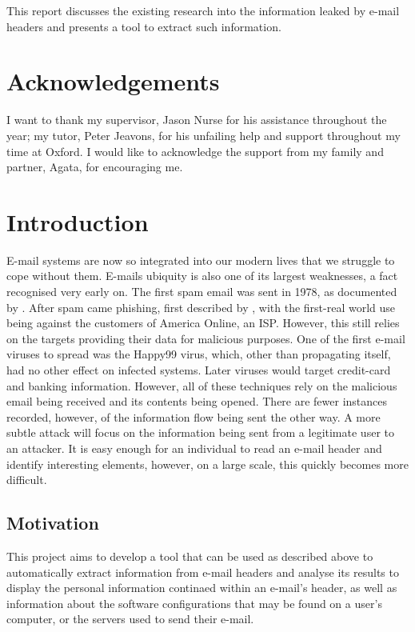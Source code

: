 \documentclass[twoside,10pt]{scrreprt}
\begin{document}
This report discusses the existing research into the information leaked by e-mail headers and presents a tool to extract such information.

\chapter*{Acknowledgements}
I want to thank my supervisor, Jason Nurse for his assistance throughout the year; my tutor, Peter Jeavons, for his unfailing help and support throughout my time at Oxford.  I would like to acknowledge the support from my family and partner, Agata, for encouraging me.

\tableofcontents
\listoftables
\listoffigures
\chapter{Introduction}
E-mail systems are now so integrated into our modern lives that we struggle to cope without them.  E-mails ubiquity is also one of its largest weaknesses, a fact recognised very early on.  The first spam email was sent in 1978, as documented by \cite{templeton}.  After spam came phishing, first described by \cite{felix1987system}, with the first-real world use being against the customers of America Online, an ISP.  However, this still relies on the targets providing their data for malicious purposes.  One of the first e-mail viruses to spread was the Happy99 virus, which, other than propagating itself, had no other effect on infected systems.  Later viruses would target credit-card and banking information.  However, all of these techniques rely on the malicious email being received and its contents being opened.  There are fewer instances recorded, however, of the information flow being sent the other way.  A more subtle attack will focus on the information being sent from a legitimate user to an attacker.  It is easy enough for an individual to read an e-mail header and identify interesting elements, however, on a large scale, this quickly becomes more difficult.

\section{Motivation}
This project aims to develop a tool that can be used as described above to automatically extract information from e-mail headers and analyse its results to display the personal information continaed within an e-mail's header, as well as information about the software configurations that may be found on a user's computer, or the servers used to send their e-mail.
\end{document}
